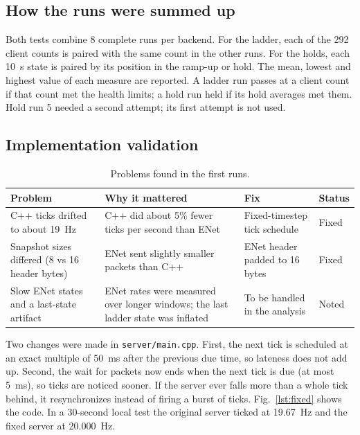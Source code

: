 \IfFileExists{IEEEtran.cls}{\ieeetrue\documentclass[conference]{IEEEtran}}{\ieeefalse\documentclass[twocolumn,10pt]{article}}
\begin{document}
\subsection{How the runs were summed up}
Both tests combine 8 complete runs per backend. For the ladder, each of the 292 client counts is paired with the same count in the other runs. For the holds, each 10~s state is paired by its position in the ramp-up or hold. The mean, lowest and highest value of each measure are reported. A ladder run passes at a client count if that count met the health limits; a hold run held if its hold averages met them. Hold run 5 needed a second attempt; its first attempt is not used.

\subsection{Implementation validation}\label{sec:fixes}
\begin{table}[H]
\caption{Problems found in the first runs.}
\label{tab:problems}
\centering
\footnotesize
\setlength{\tabcolsep}{3pt}
\begin{tabular}{p{}p{}p{}p{}}
\toprule
Problem & Why it mattered & Fix & Status \\
\midrule
C++ ticks drifted to about 19~Hz & C++ did about 5\% fewer ticks per second than ENet & Fixed-timestep tick schedule & Fixed \\
Snapshot sizes differed (8 vs 16 header bytes) & ENet sent slightly smaller packets than C++ & ENet header padded to 16 bytes & Fixed \\
Slow ENet states and a last-state artifact & ENet rates were measured over longer windows; the last ladder state was inflated & To be handled in the analysis & Noted \\
\bottomrule
\end{tabular}
\end{table}

Two changes were made in \texttt{server/main.cpp}. First, the next tick is scheduled at an exact multiple of 50~ms after the previous due time, so lateness does not add up. Second, the wait for packets now ends when the next tick is due (at most 5~ms), so ticks are noticed sooner. If the server ever falls more than a whole tick behind, it resynchronizes instead of firing a burst of ticks. Fig.~\ref{lst:fixed} shows the code. In a 30-second local test the original server ticked at 19.67~Hz and the fixed server at 20.000~Hz.
\end{document}
